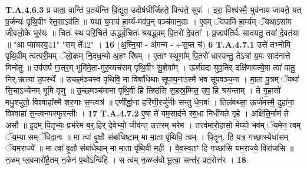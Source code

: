 \documentclass[17pt]{extarticle}
\begin{document}
                  \newline
                                                                  \textbf{ T.A.4.6.3} \newline
                  प्र वाता॒ वान्ति॑ प॒तय॑न्ति वि॒द्युत॒ उदोष॑धीर्जिहते॒ पिन्व॑ते॒ सुवः॑ । इरा॒ विश्व॑स्मै॒ भुव॑नाय जायते॒ यत् प॒र्जन्यः॑ पृथि॒वीꣳ रेत॒साऽव॑ति ॥  यथा॑ य॒माय॑ हा॒र्म्य-मव॑प॒न् पञ्च॑मान॒वाः ।  ए॒वम् ॅव॑पामि हा॒र्म्यम् ॅयथाऽसा॑म जीवलो॒के भूर॑यः ॥ चितः॑ स्थ परि॒चित॑ ऊर्द्ध्व॒चितः॑ श्रयद्ध्वम् पि॒तरो॑ दे॒वता᳚ ।  प्र॒जाप॑तिर्वः सादयतु॒ तया॑ दे॒वत॑या ॥  "आ प्या॑यस्व॒{41}" "सम् ते᳚{42}" । \textbf{ 16} \newline
                  \newline
                                                        (अ॒घ्नि॒या - अ॑गन्म - +स॒प्त च॑) \textbf{6} \newline \newline
                                \textbf{ T.A.4.7.1} \newline
                  उत्ते॑ तभ्नोमि पृथि॒वीम् त्वत्परी॒मम् ॅलो॒कम् नि॒दध॒न्मो अ॒हꣳ रि॑षम् । ए॒ताꣳ स्थूणा᳚म् पि॒तरो॑ धारयन्तु॒ तेऽत्रा॑ य॒मः साद॑नात्ते मिनोतु ॥  उप॑सर्प मा॒तर॒म् भूमि॑मे॒ता-मु॑रु॒व्यच॑सम् पृथि॒वीꣳ सु॒शेवा᳚म् । ऊर्ण॑म्रदा युव॒तिर् दक्षि॑णावत्ये॒षा त्वा॑ पातु॒ निर्.ऋ॑त्या उ॒पस्थे᳚ ॥  उच्छ्म॑ञ्चस्व पृथिवि॒ मा विबा॑धिथाः सूपाय॒नाऽस्मै॑ भव सूपवञ्च॒ना । मा॒ता पु॒त्रम् ॅयथा॑ सि॒चाऽभ्ये॑नम् भूमि वृणु ॥ उ॒च्छ्मञ्च॑माना पृथि॒वी हि तिष्ठ॑सि स॒हस्र॒म्मित॒ उप॒ हि श्रय॑न्ताम् ।  ते गृ॒हासो॑ मधु॒श्चुतो॒ विश्वाहा᳚स्मै शर॒णाः स॒न्त्वत्र॑ ॥ एणी᳚र्द्धा॒ना हरि॑णी॒रर्जु॑नीः सन्तु धे॒नवः॑ । तिल॑वथ्सा॒ ऊर्ज॑मस्मै॒ दुहा॑ना॒ विश्वाहा॑ स॒न्त्वन॑पस्फुरन्तीः । \textbf{ 17} \newline
                  \newline
                                                                  \textbf{ T.A.4.7.2} \newline
                  ए॒षा ते॑ यम॒साद॑ने स्व॒धा निधी॑यते गृ॒हे । अक्षि॑ति॒र्नाम॑ ते असौ ॥ इ॒दम् पि॒तृभ्यः॒ प्रभ॑रेम ब॒र्॒.हिर् दे॒वेभ्यो॒ जीव॑न्त॒ उत्त॑रम् भरेम ।  तत्त्व॑मारो॒हासो॒ मेघ्यो॒ भव॑म् ॅय॒मेन॒ त्वम् ॅय॒म्या॑ सम्ॅविदा॒नः ॥ मा त्वा॑ वृ॒क्षौ संबा॑धिष्टा॒म् मा मा॒ता पृ॑थिवि॒ त्वम् ।  पि॒तॄन्. हि यत्र॒ गच्छा॒स्येधा॑सम् ॅयम॒राज्ये᳚ ॥  मा त्वा॑ वृ॒क्षौ संबा॑धेथा॒म् मा मा॒ता पृ॑थि॒वी म॒ही । वै॒व॒स्व॒तꣳ हि गच्छा॑सि यम॒राज्ये॒ विरा॑जसि ॥  न॒ळम् प्ल॒वमारो॑है॒तम् न॒ळेन॑ प॒थोऽन्वि॑हि ।  स त्व॑म् न॒ळप्ल॑वो भू॒त्वा॒ सन्त॑र॒ प्रत॒रोत्त॑र । \textbf{ 18} \newline
                  \newline
\end{document}
